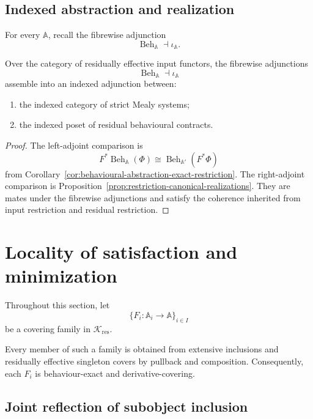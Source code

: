 \subsection{Indexed abstraction and realization}
\label{subsec:indexed-abstraction-realization}

For every \(\mathbb A\), recall the fibrewise adjunction
\[
    \operatorname{Beh}_{\mathbb A}
    \dashv
    \iota_{\mathbb A}.
\]

\begin{theorem}
\label{thm:indexed-abstraction-realization-adjunction}
Over the category of residually effective input functors, the fibrewise
adjunctions
\[
    \operatorname{Beh}_{\mathbb A}
    \dashv
    \iota_{\mathbb A}
\]
assemble into an indexed adjunction between:
\begin{enumerate}
    \item the indexed category of strict Mealy systems;
    \item the indexed poset of residual behavioural contracts.
\end{enumerate}
\end{theorem}

\begin{proof}
The left-adjoint comparison is
\[
    F^\ast
    \operatorname{Beh}_{\mathbb A}(\Phi)
    \cong
    \operatorname{Beh}_{\mathbb A'}(F^\ast\Phi)
\]
from
Corollary~\ref{cor:behavioural-abstraction-exact-restriction}.
The right-adjoint comparison is
Proposition~\ref{prop:restriction-canonical-realizations}.
They are mates under the fibrewise adjunctions and satisfy the coherence
inherited from input restriction and residual restriction.
\end{proof}

\section{Locality of satisfaction and minimization}
\label{sec:locality-satisfaction-minimization}

Throughout this section, let
\[
    \{F_i:\mathbb A_i\to\mathbb A\}_{i\in I}
\]
be a covering family in
\(\mathcal K_{\mathrm{res}}\).

Every member of such a family is obtained from extensive inclusions and
residually effective singleton covers by pullback and composition.
Consequently, each \(F_i\) is behaviour-exact and derivative-covering.

\subsection{Joint reflection of subobject inclusion}
\label{subsec:joint-reflection-subobject-inclusion}

